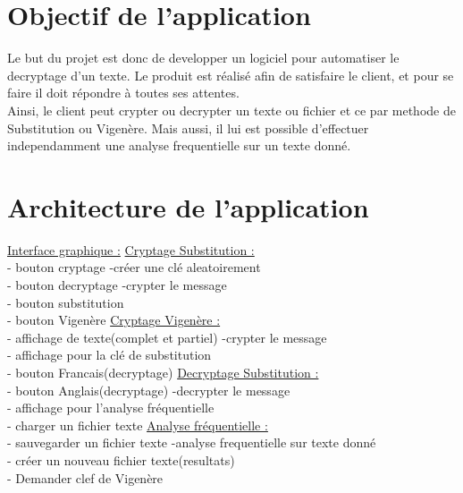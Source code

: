 \documentclass[a4]{article}
\begin{document}
	\section{Objectif de l'application}
	
	
	Le but du projet est donc de developper un logiciel pour automatiser le decryptage d'un texte.
	Le produit est réalisé afin de satisfaire le client, et pour se faire il doit répondre à toutes ses attentes.\\
	Ainsi, le client peut crypter ou decrypter un texte ou fichier et ce par methode de Substitution ou Vigenère.
	Mais aussi, il lui est possible d'effectuer independamment une analyse frequentielle sur un texte donné.
	
	

	\section{Architecture de l'application}
			\underline{Interface graphique :}     \hspace{5cm}  \underline{Cryptage Substitution :}\\
			- bouton cryptage            \hspace{5.5cm}       -créer une clé aleatoirement\\
			- bouton decryptage         \hspace{5cm}        -crypter le message\\
			- bouton substitution\\
			- bouton Vigenère           \hspace{5.2cm}       \underline{Cryptage Vigenère :}\\
			- affichage de texte(complet et partiel)  \hspace{2.2cm} -crypter le message\\
			- affichage pour la clé de substitution\\
			- bouton Francais(decryptage)   \hspace{3.5cm}     \underline{Decryptage Substitution :}\\
			- bouton Anglais(decryptage)    \hspace{3.5cm}     -decrypter le message\\
			- affichage pour l'analyse fréquentielle\\
			- charger un fichier texte       \hspace{4.2cm}  \underline{Analyse fréquentielle :}\\
			- sauvegarder un fichier texte     \hspace{3.8cm}  -analyse frequentielle sur texte donné\\
			- créer un nouveau fichier texte(resultats)\\
			- Demander clef de Vigenère\\
			
\end{document}
